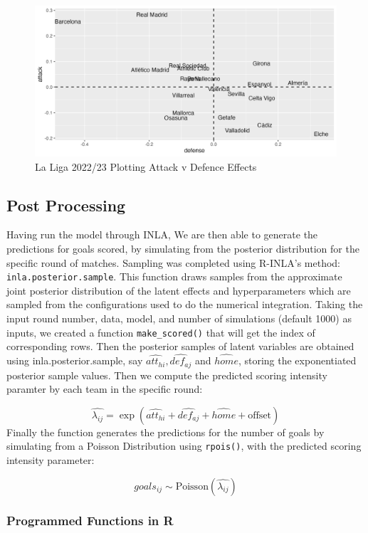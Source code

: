 \documentclass[
]{article}
\begin{document}
\begin{figure}
\includegraphics[width=0.9\linewidth,height=0.9\textheight]{joinedllattdef} \caption{La Liga 2022/23 Plotting Attack v Defence Effects}\label{fig:attdeflaligaexample}
\end{figure}

\hypertarget{post-processing}{%
\subsection{Post Processing}\label{post-processing}}

Having run the model through INLA, We are then able to generate the
predictions for goals scored, by simulating from the posterior
distribution for the specific round of matches. Sampling was completed
using R-INLA's method: \texttt{inla.posterior.sample}. This function
draws samples from the approximate joint posterior distribution of the
latent effects and hyperparameters which are sampled from the
configurations used to do the numerical integration. Taking the input
round number, data, model, and number of simulations (default 1000) as
inputs, we created a function \texttt{make\_scored()} that will get the
index of corresponding rows. Then the posterior samples of latent
variables are obtained using inla.posterior.sample, say
\(\hat{att_{hi}},\hat{def_{aj}}\) and \(\hat{home}\), storing the
exponentiated posterior sample values. Then we compute the predicted
scoring intensity paramter by each team in the specific round:

\[\hat{\lambda_{ij}} = \exp(\hat{att_{hi}} + \hat{def_{aj}} + \hat{home} + \text{offset})\]
Finally the function generates the predictions for the number of goals
by simulating from a Poisson Distribution using \texttt{rpois()}, with
the predicted scoring intensity parameter:

\[goals_{ij} \sim  \text{Poisson} ( \hat{\lambda_{ij}} )\]

\hypertarget{programmed-functions-in-r}{%
\subsubsection{Programmed Functions in
R}\label{programmed-functions-in-r}}
\end{document}
